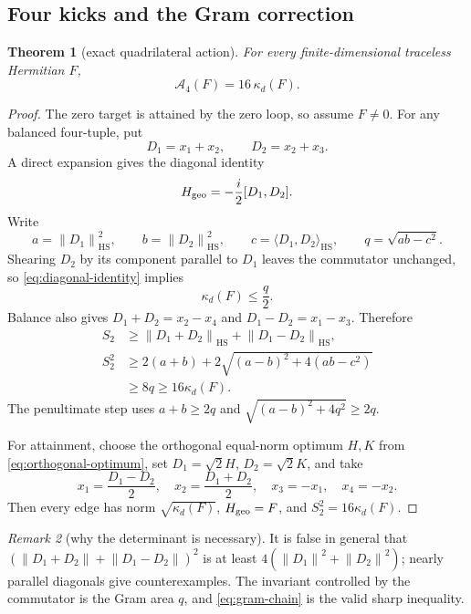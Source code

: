 \documentclass[11pt]{article}
\newtheorem{theorem}{Theorem}[section]
\theoremstyle{definition}
\theoremstyle{remark}
\newtheorem{remark}[theorem]{Remark}
\newcommand{\1}{\mathbf 1}
\newcommand{\norm}[1]{\left\lVert#1\right\rVert}
\newcommand{\HS}{\mathrm{HS}}
\begin{document}
\subsection{Four kicks and the Gram correction}

\begin{theorem}[exact quadrilateral action]
\label{thm:four}
For every finite-dimensional traceless Hermitian $F$,
\begin{equation}
 \boxed{\quad \mathcal A_4(F)=16\,\kappa_d(F).\quad}
 \label{eq:four}
\end{equation}
\end{theorem}

\begin{proof}
The zero target is attained by the zero loop, so assume $F\ne0$.  For any balanced four-tuple, put
\[
 D_1=x_1+x_2,\qquad D_2=x_2+x_3.
\]
A direct expansion gives the diagonal identity
\begin{equation}
 H_{\rm geo}=-\frac i2[D_1,D_2].
 \label{eq:diagonal-identity}
\end{equation}
Write
\[
 a=\norm{D_1}_{\HS}^2,\qquad
 b=\norm{D_2}_{\HS}^2,\qquad
 c=\langle D_1,D_2\rangle_{\HS},\qquad
 q=\sqrt{ab-c^2}.
\]
Shearing $D_2$ by its component parallel to $D_1$ leaves the commutator
unchanged, so \eqref{eq:diagonal-identity} implies
\begin{equation}
 \kappa_d(F)\le\frac q2.
 \label{eq:gram-kappa}
\end{equation}
Balance also gives
$D_1+D_2=x_2-x_4$ and $D_1-D_2=x_1-x_3$.  Therefore
\begin{align}
 S_2&\ge\norm{D_1+D_2}_{\HS}+\norm{D_1-D_2}_{\HS},\nonumber\\
 S_2^2&\ge
 2(a+b)+2\sqrt{(a-b)^2+4(ab-c^2)}\nonumber\\
 &\ge 8q\ge16\kappa_d(F).
 \label{eq:gram-chain}
\end{align}
The penultimate step uses $a+b\ge2q$ and
$\sqrt{(a-b)^2+4q^2}\ge2q$.

For attainment, choose the orthogonal equal-norm optimum $H,K$ from
\eqref{eq:orthogonal-optimum}, set $D_1=\sqrt2H$, $D_2=\sqrt2K$, and take
\begin{equation}
 x_1=\frac{D_1-D_2}{2},\quad
 x_2=\frac{D_1+D_2}{2},\quad
 x_3=-x_1,\quad x_4=-x_2.
 \label{eq:square-constructor}
\end{equation}
Then every edge has norm $\sqrt{\kappa_d(F)}$,
$H_{\rm geo}=F$, and $S_2^2=16\kappa_d(F)$.
\end{proof}

\begin{remark}[why the determinant is necessary]
It is false in general that
$(\norm{D_1+D_2}+\norm{D_1-D_2})^2$ is at least
$4(\norm{D_1}^2+\norm{D_2}^2)$; nearly parallel diagonals give
counterexamples.  The invariant controlled by the commutator is the Gram
area $q$, and \eqref{eq:gram-chain} is the valid sharp inequality.
\end{remark}
\end{document}
